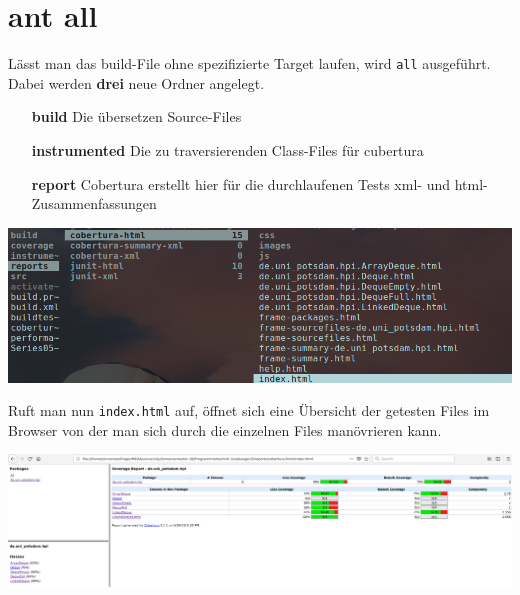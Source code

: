 \documentclass[a4paper,11pt]{scrartcl}
\begin{document}
\section{ant all}
Lässt man das build-File ohne spezifizierte Target laufen, wird \texttt{all} ausgeführt. Dabei werden \textbf{drei} neue Ordner angelegt.
\begin{itemize}
\item[\textbf{build}] Die übersetzen Source-Files
\item[\textbf{instrumented}] Die zu traversierenden Class-Files für cubertura
\item[\textbf{report}] Cobertura erstellt hier für die durchlaufenen Tests xml- und html-Zusammenfassungen
\end{itemize}
\begin{center}
\includegraphics[scale=0.45]{ordner}
\end{center}
Ruft man nun \texttt{index.html} auf, öffnet sich eine Übersicht der getesten Files im Browser von der man sich durch die einzelnen Files manövrieren kann.
\begin{center}
\includegraphics[scale=0.24]{overview}
\end{center}
\newpage
\end{document}

